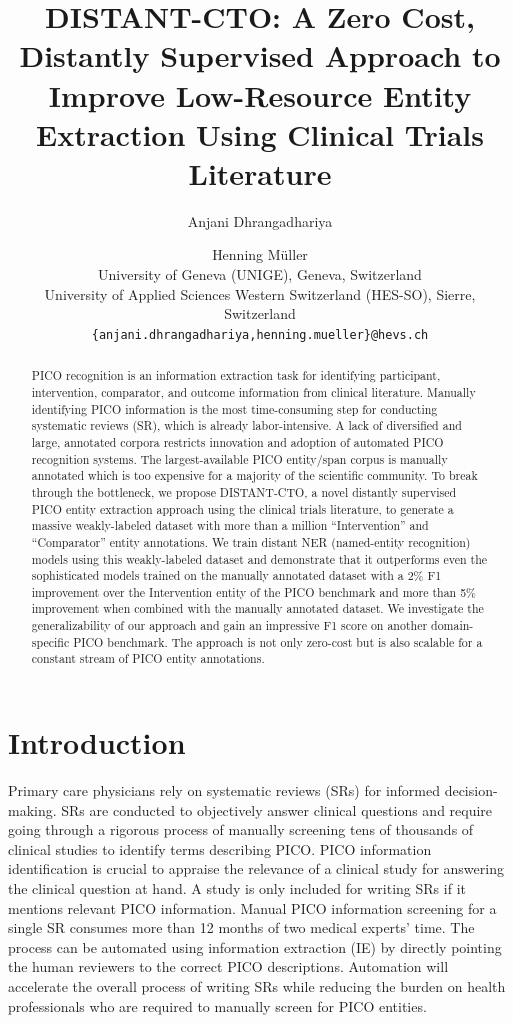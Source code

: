 \documentclass[11pt]{article}
\title{DISTANT-CTO: A Zero Cost, Distantly Supervised Approach to Improve Low-Resource Entity Extraction Using Clinical Trials Literature}
\author{Anjani Dhrangadhariya \and Henning Müller\\
         University of Geneva (UNIGE), Geneva, Switzerland \\ University of Applied Sciences Western Switzerland (HES-SO), Sierre, Switzerland \\ \texttt{\{anjani.dhrangadhariya,henning.mueller\}@hevs.ch} }
\begin{document}
\maketitle
\begin{abstract}
PICO recognition is an information extraction task for identifying participant, intervention, comparator, and outcome information from clinical literature.
Manually identifying PICO information is the most time-consuming step for conducting systematic reviews (SR), which is already labor-intensive.
A lack of diversified and large, annotated corpora restricts innovation and adoption of automated PICO recognition systems.
The largest-available PICO entity/span corpus is manually annotated which is too expensive for a majority of the scientific community.
To break through the bottleneck, we propose DISTANT-CTO, a novel distantly supervised PICO entity extraction approach using the clinical trials literature, to generate a massive weakly-labeled dataset with more than a million ``Intervention'' and ``Comparator'' entity annotations.
We train distant NER (named-entity recognition) models using this weakly-labeled dataset and demonstrate that it outperforms even the sophisticated models trained on the manually annotated dataset with a 2\% F1 improvement over the Intervention entity of the PICO benchmark and more than 5\% improvement when combined with the manually annotated dataset.
We investigate the generalizability of our approach and gain an impressive F1 score on another domain-specific PICO benchmark.
The approach is not only zero-cost but is also scalable for a constant stream of PICO entity annotations.
\end{abstract}
%
\section{Introduction}
\label{sec:intro}
%
Primary care physicians rely on systematic reviews (SRs) for informed decision-making.
SRs are conducted to objectively answer clinical questions and require going through a rigorous process of manually screening tens of thousands of clinical studies to identify terms describing PICO.
PICO information identification is crucial to appraise the relevance of a clinical study for answering the clinical question at hand.
A study is only included for writing SRs if it mentions relevant PICO information.
Manual PICO information screening for a single SR consumes more than 12 months of two medical experts' time.
The process can be automated using information extraction (IE) by directly pointing the human reviewers to the correct PICO descriptions.
Automation will accelerate the overall process of writing SRs while reducing the burden on health professionals who are required to manually screen for PICO entities.
\end{document}
